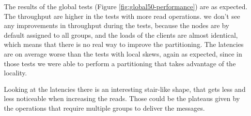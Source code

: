 


The results of the global tests (Figure \ref{fig:global50-performance}) are as expected. The throughput are higher in the tests with more read operations. we don't see any improvements in throughput during the tests, because the nodes are by default assigned to all groups, and the loads of the clients are almost identical, which means that there is no real way to improve the partitioning. The latencies are on average worse than the tests with local skews, again as expected, since in those tests we were able to perform a partitioning that takes advantage of the locality.

Looking at the latencies there is an interesting stair-like shape, that gets less and less noticeable when increasing the reads. Those could be the plateaus given by the operations that require multiple groups to deliver the messages.

